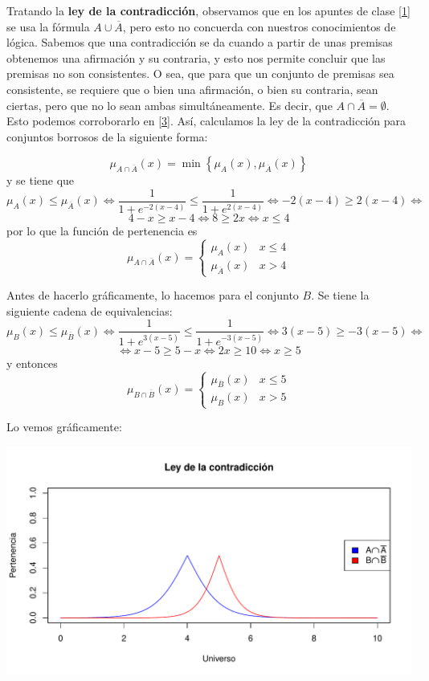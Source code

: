 \documentclass[
]{article}
\begin{document}
Tratando la \textbf{ley de la contradicción}, observamos que en los
apuntes de clase {[}\protect\hyperlink{ref-PalmaConjuntosBorrosos}{1}{]}
se usa la fórmula \(A\cup\overline{A}\), pero esto no concuerda con
nuestros conocimientos de lógica. Sabemos que una contradicción se da
cuando a partir de unas premisas obtenemos una afirmación y su
contraria, y esto nos permite concluir que las premisas no son
consistentes. O sea, que para que un conjunto de premisas sea
consistente, se requiere que o bien una afirmación, o bien su contraria,
sean ciertas, pero que no lo sean ambas simultáneamente. Es decir, que
\(A\cap\overline{A}=\emptyset\). Esto podemos corroborarlo en
{[}\protect\hyperlink{ref-Stanford}{3}{]}. Así, calculamos la ley de la
contradicción para conjuntos borrosos de la siguiente forma:

\[\mu_{A\cap\overline{A}}\left(x\right)=\min\left\{ \mu_{A}\left(x\right),\mu_{\overline{A}}\left(x\right)\right\} \]
y se tiene que
\[\mu_{A}\left(x\right)\leq\mu_{\overline{A}}\left(x\right)\iff\frac{1}{1+e^{-2\left(x-4\right)}}\leq\frac{1}{1+e^{2\left(x-4\right)}}\iff-2\left(x-4\right)\geq2\left(x-4\right)\iff\]
\[4-x\geq x-4\iff8\geq2x\iff x\leq4\] por lo que la función de
pertenencia es \[\mu_{A\cap\overline{A}}\left(x\right)=\begin{cases}
\mu_{A}\left(x\right) & x\leq4\\
\mu_{\overline{A}}\left(x\right) & x>4
\end{cases}\]

Antes de hacerlo gráficamente, lo hacemos para el conjunto \(B\). Se
tiene la siguiente cadena de equivalencias:
\[\mu_{B}\left(x\right)\leq\mu_{\overline{B}}\left(x\right)\iff\frac{1}{1+e^{3\left(x-5\right)}}\leq\frac{1}{1+e^{-3\left(x-5\right)}}\iff3\left(x-5\right)\geq-3\left(x-5\right)\iff\]
\[\iff x-5\geq5-x\iff2x\geq10\iff x\geq5\] y entonces
\[\mu_{B\cap\overline{B}}\left(x\right)=\begin{cases}
\mu_{\overline{B}}\left(x\right) & x\leq5\\
\mu_{B}\left(x\right) & x>5
\end{cases}\]

Lo vemos gráficamente:

\includegraphics{tareaBloque3_files/figure-latex/unnamed-chunk-8-1.pdf}
\end{document}
